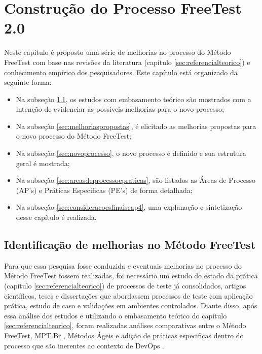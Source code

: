 \chapter{Construção do Processo FreeTest 2.0}
\label{sec:construcaoframeworkprocesso}

Neste capítulo é proposto uma série de melhorias no processo do Método FreeTest com base nas revisões da literatura (capítulo \ref{sec:referencialteorico}) e conhecimento empírico dos pesquisadores. Este capítulo está organizado da seguinte forma:

\begin{itemize}
    \item Na subseção \ref{sec:identificacaomelhoriasfreetest}, os estudos com embasamento teórico são mostrados com a intenção de evidenciar as possíveis melhorias para o novo processo;
    \item Na subseção \ref{sec:melhoriaspropostas}, é elicitado as melhorias propostas para o novo processo do Método FreeTest;
    \item Na subseção \ref{sec:novoprocesso}, o novo processo é definido e sua estrutura geral é mostrada;
    \item Na subseção \ref{sec:areasdeprocessoepraticas}, são listados as Áreas de Processo (AP's) e Práticas Especificas (PE's) de forma detalhada;
    \item Na subseção \ref{sec:consideracoesfinaiscap4}, uma explanação e sintetização desse capítulo é realizada.
\end{itemize}

\section{Identificação de melhorias no Método FreeTest}
\label{sec:identificacaomelhoriasfreetest}

Para que essa pesquisa fosse conduzida e eventuais melhorias no processo do Método FreeTest fossem realizadas, foi necessário um estudo do estado da prática (capítulo \ref{sec:referencialteorico}) de processos de teste já consolidados, artigos científicos, teses e dissertações que abordassem processos de teste com aplicação prática, estudo de caso e validações em ambientes controlados. Diante disso, após essa análise dos estudos e utilizando o embasamento teórico do capítulo \ref{sec:referencialteorico}, foram realizadas análises comparativas entre o Método FreeTest, MPT.Br \cite{GuiaMPTbr}, Métodos Ágeis \cite{Beck2001} e adição de práticas especificas dentro do processo que são inerentes ao contexto de DevOps \cite{Debois2008}. 

